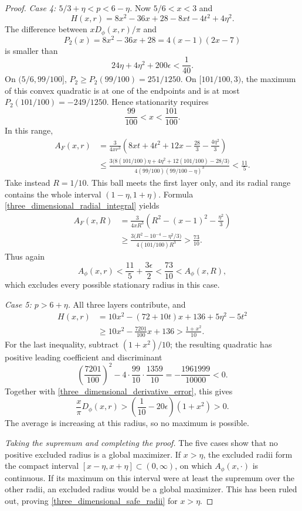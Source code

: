 \documentclass[12pt]{amsart}
\numberwithin{equation}{section}
\begin{document}
\begin{proof}
\medskip
\noindent\textit{Case 4: $5/3+\eta<p<6-\eta$.}
Now $5/6<x<3$ and
\[
H(x,r)=8x^2-36x+28-8xt-4t^2+4\eta^2.
\]
The difference between $xD_\phi(x,r)/\pi$ and
\[
P_2(x)=8x^2-36x+28=4(x-1)(2x-7)
\]
is smaller than
\[
24\eta+4\eta^2+200\epsilon<\frac1{40}.
\]
On $(5/6,99/100]$, $P_2\geq P_2(99/100)=251/1250$.
On $[101/100,3)$, the maximum of this convex quadratic is at one
of the endpoints and is at most
$P_2(101/100)=-249/1250$. Hence stationarity requires
\begin{equation}
\label{three_dimensional_second_critical_range}
\frac{99}{100}<x<\frac{101}{100}.
\end{equation}
In this range,
\begin{align*}
A_F(x,r)
 &=\frac{3}{4xr^3}
       \left(8xt+4t^2+12x-\frac{28}{3}-\frac{4\eta^2}{3}\right)\\
 &\leq\frac{3\bigl(8(101/100)\eta+4\eta^2+12(101/100)-28/3\bigr)}
              {4(99/100)(99/100-\eta)^3}
 <\frac{11}{5}.
\end{align*}
Take instead $R=1/10$. This ball meets the first layer only, and
its radial range contains the whole interval $(1-\eta,1+\eta)$.
Formula \eqref{three_dimensional_radial_integral} yields
\begin{align*}
A_F(x,R)
 &=\frac{3}{4xR^3}
       \left(R^2-(x-1)^2-\frac{\eta^2}{3}\right)\\
 &\geq\frac{3\bigl(R^2-10^{-4}-\eta^2/3\bigr)}
              {4(101/100)R^3}
 >\frac{73}{10}.
\end{align*}
Thus again
\[
A_\phi(x,r)<\frac{11}{5}+\frac{3\epsilon}{2}
       <\frac{73}{10}<A_\phi(x,R),
\]
which excludes every possible stationary radius in this case.

\medskip
\noindent\textit{Case 5: $p>6+\eta$.}
All three layers contribute, and
\begin{align*}
H(x,r)
 &=10x^2-(72+10t)x+136+5\eta^2-5t^2\\
 &\geq10x^2-\frac{7201}{100}x+136
 >\frac{1+x^2}{10}.
\end{align*}
For the last inequality, subtract $(1+x^2)/10$; the resulting
quadratic has positive leading coefficient and discriminant
\[
\left(\frac{7201}{100}\right)^2
       -4\cdot\frac{99}{10}\cdot\frac{1359}{10}
       =-\frac{1961999}{10000}<0.
\]
Together with \eqref{three_dimensional_derivative_error}, this gives
\[
\frac{x}{\pi}D_\phi(x,r)
       >\left(\frac1{10}-20\epsilon\right)(1+x^2)>0.
\]
The average is increasing at this radius, so no maximum is possible.

\medskip
\noindent\textit{Taking the supremum and completing the proof.}
The five cases show that no positive excluded radius is a global
maximizer. If $x>\eta$, the excluded radii form the compact interval
$[x-\eta,x+\eta]\subset(0,\infty)$, on which $A_\phi(x,\cdot)$ is
continuous. If its maximum on this interval were at least the
supremum over the other radii, an excluded radius would be a global
maximizer. This has been ruled out, proving
\eqref{three_dimensional_safe_radii} for $x>\eta$.


\end{proof}
\end{document}
